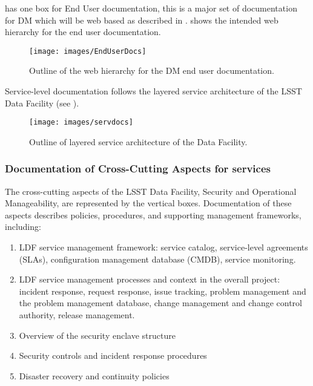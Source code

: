  has one box for End User documentation, this is a major set of documentation for DM which will be web based as  described in  .  shows the intended web hierarchy for the end user documentation.

\begin{figure}
\begin{center}
 \texttt{[image: images/EndUserDocs]}
\caption{Outline of the web hierarchy for the DM end user documentation. \label{fig:eudoc}}
\end{center}
\end{figure}



Service-level documentation follows the layered service architecture of the LSST Data Facility (see ).

\begin{figure}
\begin{center}
 \texttt{[image: images/servdocs]}
\caption{Outline of layered service architecture of the Data Facility. \label{fig:servdoc}}
\end{center}
\end{figure}

\subsubsection {Documentation of Cross-Cutting Aspects for services}

The cross-cutting aspects of the LSST Data Facility, Security and Operational Manageability, are represented by the vertical boxes. Documentation of these aspects describes policies, procedures, and supporting management frameworks, including:
\begin{enumerate}
	\item	LDF service management framework: service catalog, service-level agreements (SLAs), configuration management database (CMDB), service monitoring.
	\item	LDF service management processes and context in the overall project: incident response, request response, issue tracking, problem management and the problem management database, change management and change control authority, release management.
	\item	Overview of the security enclave structure
	\item	Security controls and incident response procedures
	\item	Disaster recovery and continuity policies
\end{enumerate}

